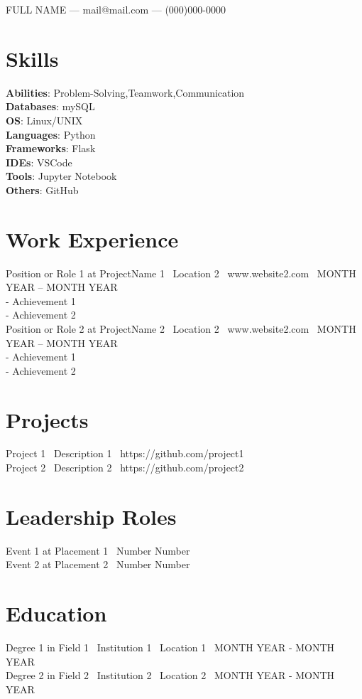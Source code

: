 \documentclass[a4paper,10pt]{article}
\begin{document}
\newcommand{\Name}[1]{{\Huge #1}}
\newcommand{\Email}[1]{{ --- #1}}
\newcommand{\Phone}[1]{{ --- #1}}
\Name{FULL NAME}
\Email{mail@mail.com}
\Phone{(000)000-0000}
\section*{Skills}\textbf{Abilities}: Problem-Solving,Teamwork,Communication \\ 
\textbf{Databases}: mySQL \\ 
\textbf{OS}: Linux/UNIX \\ 
\textbf{Languages}: Python \\ 
\textbf{Frameworks}: Flask \\ 
\textbf{IDEs}: VSCode \\ 
\textbf{Tools}: Jupyter Notebook \\ 
\textbf{Others}: GitHub \\ 
\section*{Work Experience}Position or Role 1 at ProjectName 1 \ Location 2 \ www.website2.com \ MONTH YEAR – MONTH YEAR \\ 
- Achievement 1 \\ 
- Achievement 2 \\ 
Position or Role 2 at ProjectName 2 \ Location 2 \ www.website2.com \ MONTH YEAR – MONTH YEAR \\ 
- Achievement 1 \\ 
- Achievement 2 \\ 
\section*{Projects}Project 1 \ Description 1 \ https://github.com/project1 \\ 
Project 2 \ Description 2 \ https://github.com/project2 \\ 
\section*{Leadership Roles}Event 1 at Placement 1 \ Number Number\\ 
Event 2 at Placement 2 \ Number Number\\ 
\section*{Education}Degree 1 in Field 1 \ Institution 1 \ Location 1 \ MONTH YEAR - MONTH YEAR \\ 
Degree 2 in Field 2 \ Institution 2 \ Location 2 \ MONTH YEAR - MONTH YEAR \\ 
\end{document}
